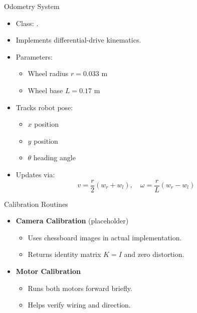 \begin{frame}{Odometry System}
	\begin{itemize}
		\item Class: .
		\item Implements differential-drive kinematics.
		\item Parameters:
		\begin{itemize}
			\item Wheel radius \(r = 0.033\) m
			\item Wheel base \(L = 0.17\) m
		\end{itemize}
		\item Tracks robot pose:
		\begin{itemize}
			\item \(x\) position
			\item \(y\) position
			\item \(\theta\) heading angle
		\end{itemize}
		\item Updates via:
		\[
		v = \frac{r}{2}(w_r + w_l), \quad
		\omega = \frac{r}{L}(w_r - w_l)
		\]
	\end{itemize}
\end{frame}

\begin{frame}{Calibration Routines}
	\begin{itemize}
		\item \textbf{Camera Calibration} (placeholder)
		\begin{itemize}
			\item Uses chessboard images in actual implementation.
			\item Returns identity matrix \(K=I\) and zero distortion.
		\end{itemize}
		\item \textbf{Motor Calibration}
		\begin{itemize}
			\item Runs both motors forward briefly.
			\item Helps verify wiring and direction.
		\end{itemize}
	\end{itemize}
\end{frame}

